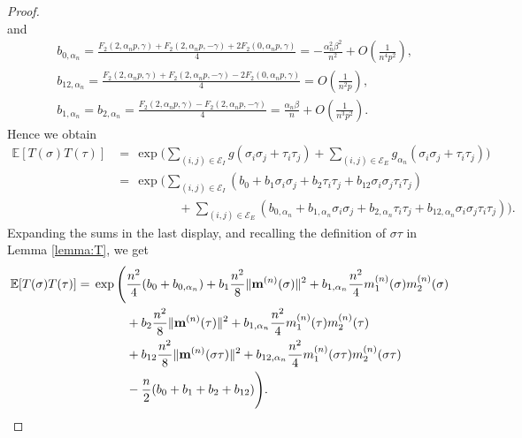 \documentclass[11pt,oneside]{amsart}
\numberwithin{equation}{section}  %
\theoremstyle{plain}
\theoremstyle{remark}
\def \E {{\mathbb E}}
\def \cE {\mathcal{E}}
\def \bm {{\bf m}}
\begin{document}
\begin{proof}
\begin{equation}
\end{equation}
and
\begin{equation}
\label{eq:cost-balpha}
\begin{split}
& b_{0, \alpha_n} = \frac{F_2(2,\alpha_n p, \gamma) + F_2(2,\alpha_n p,-\gamma) + 2F_2(0,\alpha_n p,\gamma)}{4} = - \frac{\alpha_n^2 \beta^2}{n^2} + O \left( \frac{1}{n^4p^2}\right), \\
& b_{12, \alpha_n} = \frac{F_2(2,\alpha_n p, \gamma) + F_2(2,\alpha_n p,-\gamma) - 2F_2(0,\alpha_n p,\gamma)}{4} = O \left( \frac{1}{n^2p}\right), \\
& b_{1,\alpha_n} = b_{2,\alpha_n} = \frac{F_2(2,\alpha_n p, \gamma) - F_2(2,\alpha_n p,-\gamma)}{4} = \frac{\alpha_n \beta}{n} + O \left( \frac{1}{n^3 p^2}\right).
\end{split}
\end{equation}
Hence we obtain
\begin{equation*}
\begin{split}
\E[T(\sigma)T(\tau)]  & =\, \exp \Bigg( \sum_{(i,j) \in \cE_I} g(\sigma_i \sigma_j + \tau_i \tau_j) + \sum_{(i,j) \in \cE_E} g_{\alpha_n}(\sigma_i \sigma_j + \tau_i \tau_j)\Bigg) \\
& = \, \exp \Bigg( \sum_{(i,j) \in \cE_I} (b_0 + b_1 \sigma_i \sigma_j + b_2 \tau_i \tau_j + b_{12} \sigma_i \sigma_j \tau_i \tau_j) \\
& \qquad \qquad \quad + \sum_{(i,j) \in \cE_E} (b_{0, \alpha_n} + b_{1, \alpha_n} \sigma_i \sigma_j + b_{2, \alpha_n} \tau_i \tau_j + b_{12, \alpha_n} \sigma_i \sigma_j \tau_i \tau_j) \Bigg).
\end{split}
\end{equation*}
Expanding the sums in the last display, and recalling the definition of $\sigma\tau$ in Lemma \ref{lemma:T}, we get 
\begin{equation*}
\begin{split}
\E[T(\sigma)T(\tau)] 
& 
= \, \exp \Bigg( \frac{n^2}{4}(b_0 + b_{0,\alpha_n})
 + b_1 \frac{n^2}{8} \|\bm^{(n)}(\sigma)\|^2  + b_{1,\alpha_n} \frac{n^2}{4} m_1^{(n)}(\sigma) m_2^{(n)}(\sigma) \\ 
& \qquad \qquad 
+ b_2\frac{n^2}{8} \|\bm^{(n)}(\tau)\|^2 + b_{1,\alpha_n} \frac{n^2}{4} m_1^{(n)}(\tau) m_2^{(n)}(\tau) \\ 
& \qquad \qquad + b_{12} \frac{n^2}{8} \|\bm^{(n)}(\sigma\tau)\|^2 + b_{12,\alpha_n} \frac{n^2}{4} m_1^{(n)}(\sigma\tau) m_2^{(n)}(\sigma\tau) \\
& \qquad \qquad -\frac{n}{2} (b_0+b_1+b_2+b_{12})\Bigg).
\end{split}

\end{equation*}
\end{proof}
\end{document}
